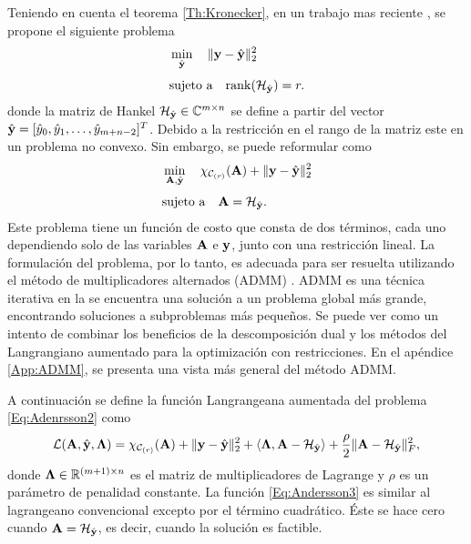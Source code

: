 	Teniendo en cuenta el teorema \eqref{Th:Kronecker}, en un trabajo mas reciente \cite{Andersson2014}, se propone el siguiente problema  
	\begin{equation}
		\begin{aligned} 
			& \min_{\hat{\mathbf{y}}} \quad \|\mathbf{y} - \hat{\mathbf{y}}\|_2^2 \\[0.3em]
			& \text{sujeto a} \quad  \mathrm{rank}(\mathcal{H}_{\hat{\mathbf{y}}}) = r.
		\end{aligned}
		\label{Eq:Andersson1}
	\end{equation}
	donde la matriz de Hankel $\mathcal{H}_{\hat{\mathbf{y}}}\in\mathbb{C}^{m\times n}$ se define a partir del vector $\hat{\mathbf{y}} = [\hat{y}_0, \hat{y}_1,\ldots, \hat{y}_{m+n-2}]^T$.
	Debido a la restricción en el rango de la matriz este en un problema no convexo. Sin embargo, se puede reformular como	
	\begin{equation}
		\begin{aligned} 
			& \min_{\mathbf{A},\hat{\mathbf{y}}} \quad \chi_{\mathcal{C}_{(r)}}(\mathbf{A}) + \|\mathbf{y}-\hat{\mathbf{y}}\|_2^2\\[0.3em]
			& \text{sujeto a} \quad  \mathbf{A} = \mathcal{H}_{\hat{\mathbf{y}}}.
		\end{aligned}
		\label{Eq:Adenrsson2}			 
	\end{equation}
	Este problema tiene un función de costo que consta de dos términos, cada uno dependiendo solo de las variables $\mathbf{A}$ e $\mathbf{y}$, junto con una restricción lineal. La formulación del problema, por lo tanto, es adecuada para ser resuelta utilizando el método de multiplicadores alternados (ADMM) \cite{Boyd2011}. ADMM es una técnica iterativa en la se encuentra una solución a un problema global más grande, encontrando soluciones a subproblemas más pequeños. Se puede ver como un intento de combinar los beneficios de la descomposición dual y los métodos del Langrangiano aumentado para la optimización con restricciones. En el apéndice \ref{App:ADMM}, se presenta una vista más general del método ADMM.
	
	
	A continuación se define la función Langrangeana aumentada del problema \eqref{Eq:Adenrsson2} como
	\begin{equation}
		\mathcal{L}(\mathbf{A},\hat{\mathbf{y}},\boldsymbol{\Lambda}) =\chi_{\mathcal{C}_{(r)}}(\mathbf{A}) + \|\mathbf{y}-\hat{\mathbf{y}}\|_2^2  + \langle\boldsymbol{\Lambda},\mathbf{A}-\mathcal{H}_{\hat{\mathbf{y}}}\rangle + \frac{\rho}{2}\|\mathbf{A} - \mathcal{H}_{\hat{\mathbf{y}}}\|_F^2,
		\label{Eq:Andersson3}
	\end{equation}
	donde $\boldsymbol{\Lambda}\in\mathbb{R}^{(m+1)\times n}$ es el matriz de multiplicadores de Lagrange y $\rho$ es un parámetro de penalidad constante. La función \eqref{Eq:Andersson3} es similar al lagrangeano convencional excepto por el término cuadrático. Éste se hace cero cuando $\mathbf{A} = \mathcal{H}_{\hat{\mathbf{y}}}$, es decir, cuando la solución es factible. 

